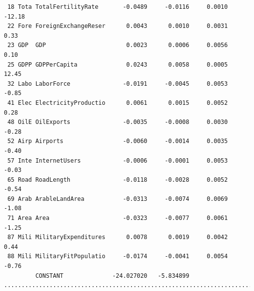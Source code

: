 \documentclass[a4paper,10pt,twocolumn]{article}
\begin{document}
\begin{landscape}
\begin{verbatim}
 18 Tota TotalFertilityRate       -0.0489     -0.0116     0.0010 -12.18
 22 Fore ForeignExchangeReser      0.0043      0.0010     0.0031   0.33
 23 GDP  GDP                       0.0023      0.0006     0.0056   0.10
 25 GDPP GDPPerCapita              0.0243      0.0058     0.0005  12.45
 32 Labo LaborForce               -0.0191     -0.0045     0.0053  -0.85
 41 Elec ElectricityProductio      0.0061      0.0015     0.0052   0.28
 48 OilE OilExports               -0.0035     -0.0008     0.0030  -0.28
 52 Airp Airports                 -0.0060     -0.0014     0.0035  -0.40
 57 Inte InternetUsers            -0.0006     -0.0001     0.0053  -0.03
 65 Road RoadLength               -0.0118     -0.0028     0.0052  -0.54
 69 Arab ArableLandArea           -0.0313     -0.0074     0.0069  -1.08
 71 Area Area                     -0.0323     -0.0077     0.0061  -1.25
 87 Mili MilitaryExpenditures      0.0078      0.0019     0.0042   0.44
 88 Mili MilitaryFitPopulatio     -0.0174     -0.0041     0.0054  -0.76
         CONSTANT              -24.027020   -5.834899
..............................................................................


\end{verbatim}
\end{landscape}
\end{document}
